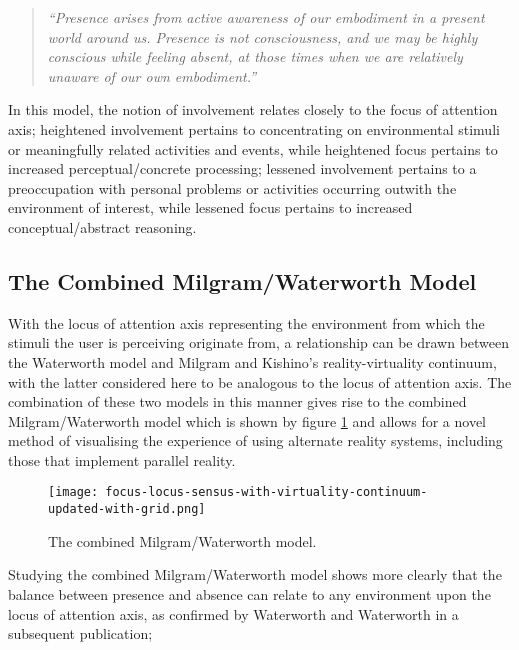 \begin{quote}
	\textit{``Presence arises from active awareness of our embodiment in a present world around us. Presence is not consciousness, and we may be highly conscious while feeling absent, at those times when we are relatively unaware of our own embodiment.''}~\cite{Waterworth2014}
\end{quote}

In this model, the notion of involvement relates closely to the focus of attention axis; heightened involvement pertains to concentrating on environmental stimuli or meaningfully related activities and events, while heightened focus pertains to increased perceptual/concrete processing; lessened involvement pertains to a preoccupation with personal problems or activities occurring outwith the environment of interest, while lessened focus pertains to increased conceptual/abstract reasoning.


\subsection{The Combined Milgram/Waterworth Model}
\label{combined-milgram-waterworth-model}
With the locus of attention axis representing the environment from which the stimuli the user is perceiving originate from, a relationship can be drawn between the Waterworth model and Milgram and Kishino's reality-virtuality continuum, with the latter considered here to be analogous to the locus of attention axis. The combination of these two models in this manner gives rise to the combined Milgram/Waterworth model which is shown by figure \ref{focus-locus-sensus-with-virtuality-continuum} and allows for a novel method of visualising the experience of using alternate reality systems, including those that implement parallel reality.

\begin{figure}[h]
	\begin{center}
		\texttt{[image: focus-locus-sensus-with-virtuality-continuum-updated-with-grid.png]}
		\caption{The combined Milgram/Waterworth model.}
		\label{focus-locus-sensus-with-virtuality-continuum}
	\end{center}	
\end{figure}

Studying the combined Milgram/Waterworth model shows more clearly that the balance between presence and absence can relate to any environment upon the locus of attention axis, as confirmed by Waterworth and Waterworth in a subsequent publication;

